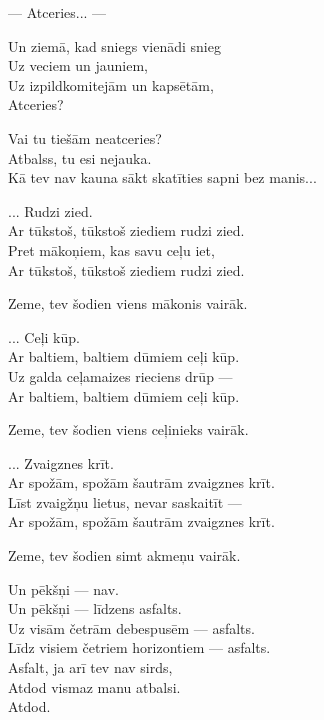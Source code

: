 \documentclass[14pt]{extarticle}
\begin{document}
--- Atceries... ---

Un ziemā, kad sniegs vienādi snieg\\
Uz veciem un jauniem,\\
Uz izpildkomitejām un kapsētām,\\
Atceries?

Vai tu tiešām neatceries?\\
Atbalss, tu esi nejauka.\\
Kā tev nav kauna sākt skatīties sapni bez manis...

\mbox{}\hspace{10pt}... Rudzi zied.\\
\mbox{}\hspace{10pt}Ar tūkstoš, tūkstoš ziediem rudzi zied.\\
\mbox{}\hspace{10pt}Pret mākoņiem, kas savu ceļu iet,\\
\mbox{}\hspace{10pt}Ar tūkstoš, tūkstoš ziediem rudzi zied.

Zeme, tev šodien viens mākonis vairāk.

\mbox{}\hspace{10pt}... Ceļi kūp.\\
\mbox{}\hspace{10pt}Ar baltiem, baltiem dūmiem ceļi kūp.\\
\mbox{}\hspace{10pt}Uz galda ceļamaizes rieciens drūp ---\\
\mbox{}\hspace{10pt}Ar baltiem, baltiem dūmiem ceļi kūp.

Zeme, tev šodien viens ceļinieks vairāk.

\mbox{}\hspace{10pt}... Zvaigznes krīt.\\
\mbox{}\hspace{10pt}Ar spožām, spožām šautrām zvaigznes krīt.\\
\mbox{}\hspace{10pt}Līst zvaigžņu lietus, nevar saskaitīt ---\\
\mbox{}\hspace{10pt}Ar spožām, spožām šautrām zvaigznes krīt.

Zeme, tev šodien simt akmeņu vairāk.

Un pēkšņi --- nav.\\
Un pēkšņi --- līdzens asfalts.\\
Uz visām četrām debespusēm --- asfalts.\\
Līdz visiem četriem horizontiem --- asfalts.\\
Asfalt, ja arī tev nav sirds,\\
Atdod vismaz manu atbalsi.\\
Atdod.
\end{document}
